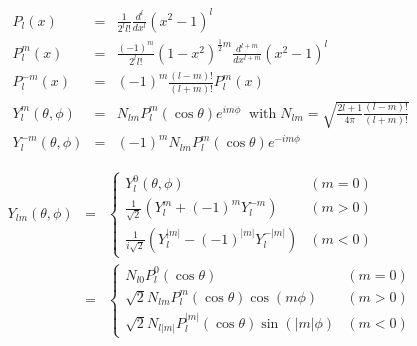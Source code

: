 \documentclass[a4paper,9pt,twoside]{article}
\begin{document}
\begin{eqnarray}
P_l(x) &=& \frac{1}{2^l l!} \frac{d^l}{dx^l}(x^2-1)^l \\
P_l^m(x) &=& \frac{(-1)^m}{2^l l!} (1-x^2)^{\frac{1}{2}m} \frac{d^{l+m}}{dx^{l+m}} (x^2-1)^l\\
P_l^{-m}(x) & = & (-1)^m \frac{(l-m)!}{(l+m)!}P_l^m(x) \\
Y_l^m (\theta,\phi) &=& N_{lm} P_l^m(\cos\theta)e^{im\phi}\;\;\mathrm{with}\;N_{lm} =\sqrt{ \frac{2l+1}{4\pi}\frac{(l-m)!}{(l+m)!} } \\
Y_l^{-m}(\theta,\phi) &=& (-1)^m N_{lm}P_l^m(\cos\theta) e^{-im\phi}
\end{eqnarray}

\begin{eqnarray}
Y_{lm}(\theta,\phi) & = & \left\{ \begin{array}{cl} 
                                             Y_l^0(\theta,\phi) & (m=0) \\
                                             \frac{1}{\sqrt{2}} \left( Y_l^m + (-1)^m Y_l^{-m}\right)  & (m>0) \\
                                             \frac{1}{i\sqrt{2}}\left( Y_l^{|m|}-(-1)^{|m|}Y_l^{-|m|} \right) & (m<0)
                                  \end{array}\right.\\
                    & = & \left\{ \begin{array}{cl} 
                                             N_{l0} P_l^0(\cos\theta) & (m=0) \\
                                             \sqrt{2}N_{lm}P_l^m(\cos\theta)\cos(m\phi) & (m>0) \\
                                             \sqrt{2}N_{l|m|} P_l^{|m|}(\cos\theta)\sin(|m|\phi)& (m<0)
                                  \end{array}\right.
\end{eqnarray}
\end{document}
